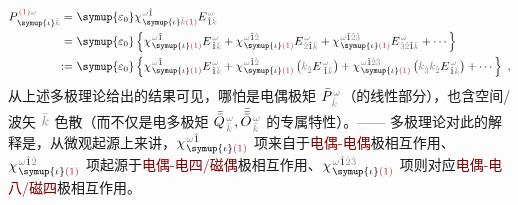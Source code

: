 \begin{subequations}
\begin{align}
	P^{\;\! \textcolor{Maroon}{(1)} \mathcolor{gray}{\omega}}_{\;\! \symup{\iota}\mathcolor{gray}{\bar{k}}} =&~ {\symup{\varepsilon_0}} \chi^{\;\! \mathcolor{gray}{\omega} \hat{1}}_{\;\! \symup{\iota} \mathcolor{gray}{\bar{k}} \textcolor{Maroon}{(1)}} E^{\;\!\mathcolor{gray}{\omega}}_{\;\! \hat{1} \mathcolor{gray}{\bar{k}}} \\ =&~ {\symup{\varepsilon_0}} \left\{ \chi^{\;\! \mathcolor{gray}{\omega} \hat{1}}_{\;\! \symup{\iota} \textcolor{Maroon}{(1)}} E^{\;\!\mathcolor{gray}{\omega}}_{\;\! \hat{1} \mathcolor{gray}{\bar{k}}} + \chi^{\;\! \mathcolor{gray}{\omega} \hat{1} \mathcolor{gray}{\hat{2}}}_{\;\! \symup{\iota} \textcolor{Maroon}{(1)}} E^{\;\!\mathcolor{gray}{\omega}}_{\;\! \mathcolor{gray}{\hat{2}} \hat{1} \mathcolor{gray}{\bar{k}}} + \chi^{\;\! \mathcolor{gray}{\omega} \hat{1} \mathcolor{gray}{\hat{2} \hat{3}}}_{\;\! \symup{\iota} \textcolor{Maroon}{(1)}} E^{\;\!\mathcolor{gray}{\omega}}_{\;\! \mathcolor{gray}{\hat{3} \hat{2}} \hat{1} \mathcolor{gray}{\bar{k}}} + \cdots \right\}  \label{P(1)_wk} \\ :=&~ {\symup{\varepsilon_0}} \left\{ \chi^{\;\! \mathcolor{gray}{\omega} \hat{1}}_{\;\! \symup{\iota} \textcolor{Maroon}{(1)}} E^{\;\!\mathcolor{gray}{\omega}}_{\;\! \hat{1} \mathcolor{gray}{\bar{k}}} + \chi^{\;\! \mathcolor{gray}{\omega} \hat{1} \mathcolor{gray}{\hat{2}}}_{\;\! \symup{\iota} \textcolor{Maroon}{(1)}} \left( \mathcolor{gray}{k_{\hat{2}}} E^{\;\!\mathcolor{gray}{\omega}}_{\;\hat{1} \mathcolor{gray}{\bar{k}}} \right) + \chi^{\;\! \mathcolor{gray}{\omega} \hat{1} \mathcolor{gray}{\hat{2} \hat{3}}}_{\;\! \symup{\iota} \textcolor{Maroon}{(1)}} \left( \mathcolor{gray}{k_{\hat{3}}} \mathcolor{gray}{k_{\hat{2}}} E^{\;\!\mathcolor{gray}{\omega}}_{\;\! \hat{1} \mathcolor{gray}{\bar{k}}} \right) + \cdots \right\}~,
\end{align}
\end{subequations}
从上述多极理论给出的结果可见，哪怕是电偶极矩 $\bar{P}^{\;\!\mathcolor{gray}{\omega}}_{\;\!\mathcolor{gray}{\bar{k}}}$（的线性部分），也含空间/波矢 $\mathcolor{gray}{\bar{k}}$ 色散（而不仅是电多极矩 $\bar{\bar{Q}}^{\;\!\mathcolor{gray}{\omega}}_{\;\!\mathcolor{gray}{\bar{k}}},\bar{\bar{\bar{O}}}^{\;\!\mathcolor{gray}{\omega}}_{\;\!\mathcolor{gray}{\bar{k}}}$ 的专属特性）。—— 多极理论对此的解释是，从微观起源上来讲，$\chi^{\;\! \mathcolor{gray}{\omega} \hat{1}}_{\;\! \symup{\iota} \textcolor{Maroon}{(1)}}$ 项来自于\textcolor{Maroon}{电偶-电偶}极相互作用、$\chi^{\;\! \mathcolor{gray}{\omega} \hat{1} \mathcolor{gray}{\hat{2}}}_{\;\! \symup{\iota} \textcolor{Maroon}{(1)}}$ 项起源于\textcolor{Maroon}{电偶-电四/磁偶}极相互作用、$\chi^{\;\! \mathcolor{gray}{\omega} \hat{1} \mathcolor{gray}{\hat{2} \hat{3}}}_{\;\! \symup{\iota} \textcolor{Maroon}{(1)}}$ 项则对应\textcolor{Maroon}{电偶-电八/磁四}极相互作用。

